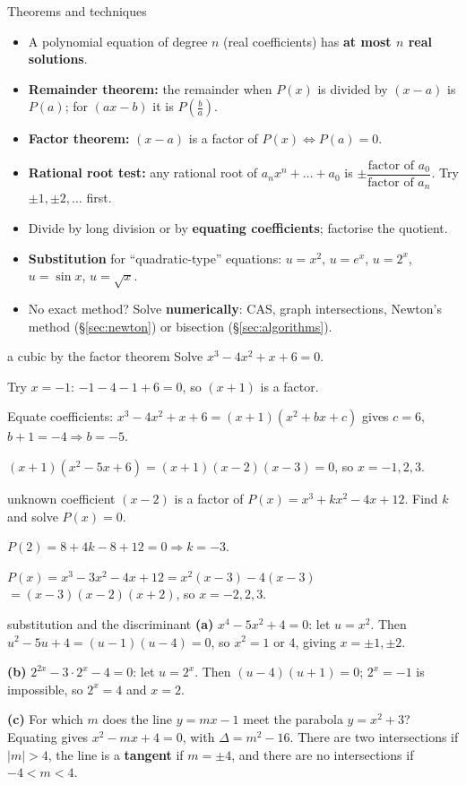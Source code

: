 \begin{keyres}{Theorems and techniques}
\begin{itemize}
  \item A polynomial equation of degree $n$ (real coefficients) has \textbf{at most $n$ real solutions}.
  \item \textbf{Remainder theorem:} the remainder when $P(x)$ is divided by $(x-a)$ is $P(a)$; for $(ax-b)$ it is $P\!\left(\frac ba\right)$.
  \item \textbf{Factor theorem:} $(x-a)$ is a factor of $P(x)\iff P(a)=0$.
  \item \textbf{Rational root test:} any rational root of $a_nx^n+\dots+a_0$ is $\pm\dfrac{\text{factor of }a_0}{\text{factor of }a_n}$. Try $\pm1,\pm2,\dots$ first.
  \item Divide by long division or by \textbf{equating coefficients}; factorise the quotient.
  \item \textbf{Substitution} for ``quadratic-type'' equations: $u=x^2$, $u=e^x$, $u=2^x$, $u=\sin x$, $u=\sqrt{x}$.
  \item No exact method? Solve \textbf{numerically}: CAS, graph intersections, Newton's method (\S\ref{sec:newton}) or bisection (\S\ref{sec:algorithms}).
\end{itemize}
\end{keyres}

\begin{cols}
\begin{example}{a cubic by the factor theorem \byhand}
Solve $x^3-4x^2+x+6=0$.\par
Try $x=-1$: $-1-4-1+6=0$, so $(x+1)$ is a factor.\par
Equate coefficients: $x^3-4x^2+x+6=(x+1)(x^2+bx+c)$ gives $c=6$, $b+1=-4\Rightarrow b=-5$.\par
$(x+1)(x^2-5x+6)=(x+1)(x-2)(x-3)=0$, so $x=-1,2,3$.
\end{example}
\nextcol
\begin{example}{unknown coefficient \byhand}
$(x-2)$ is a factor of $P(x)=x^3+kx^2-4x+12$. Find $k$ and solve $P(x)=0$.\par
$P(2)=8+4k-8+12=0\Rightarrow k=-3$.\par
$P(x)=x^3-3x^2-4x+12=x^2(x-3)-4(x-3)$\\ $=(x-3)(x-2)(x+2)$, so $x=-2,2,3$.
\end{example}
\end{cols}

\begin{example}{substitution and the discriminant \byhand}
\textbf{(a)} $x^4-5x^2+4=0$: let $u=x^2$. Then $u^2-5u+4=(u-1)(u-4)=0$, so $x^2=1$ or $4$, giving $x=\pm1,\pm2$.\par
\textbf{(b)} $2^{2x}-3\cdot2^x-4=0$: let $u=2^x$. Then $(u-4)(u+1)=0$; $2^x=-1$ is impossible, so $2^x=4$ and $x=2$.\par
\textbf{(c)} For which $m$ does the line $y=mx-1$ meet the parabola $y=x^2+3$? Equating gives $x^2-mx+4=0$, with $\Delta=m^2-16$. There are two intersections if $|m|>4$, the line is a \textbf{tangent} if $m=\pm4$, and there are no intersections if $-4<m<4$.
\end{example}

